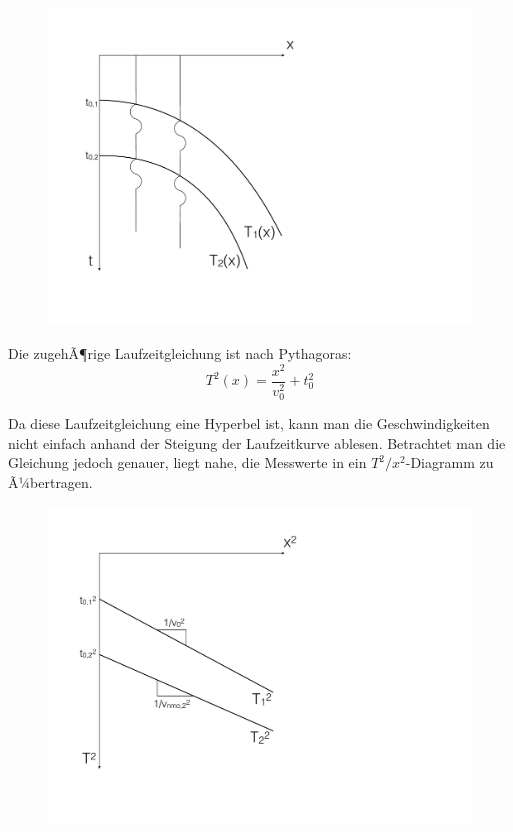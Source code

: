 \begin{figure}[H]
	\centering
	\includegraphics[scale = 0.3]{ReflexionsseismikBilder/t-x-Diagramm}
\end{figure} 


Die zugehÃ¶rige Laufzeitgleichung ist nach Pythagoras: \begin{equation*}
	T^2(x) = \frac{x^2}{v_0^2} + t_0^2
\end{equation*}

Da diese Laufzeitgleichung eine Hyperbel ist, kann man die Geschwindigkeiten nicht einfach anhand der Steigung der Laufzeitkurve ablesen. Betrachtet man die Gleichung jedoch genauer, liegt nahe, die Messwerte in ein $T^2/ x^2$-Diagramm zu Ã¼bertragen.

\begin{figure}[H]
	\centering
	\includegraphics[scale = 0.3]{ReflexionsseismikBilder/T2-X2-Diagramm}
\end{figure}


